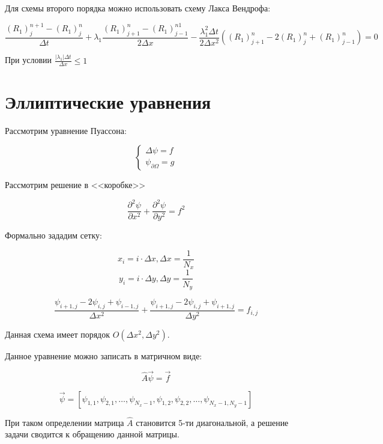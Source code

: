 \documentclass[10pt,a4paper]{article}
\begin{document}
	Для схемы второго порядка можно использовать схему Лакса Вендрофа:
	
	\begin{equation}
		\frac{\left(R_{1}\right)^{n + 1}_{j} - \left(R_{1}\right)^{n}_{j}}
		{\Delta t} + \lambda_{1}
		\frac{\left(R_{1}\right)^{n}_{j + 1} - \left(R_{1}\right)^{n1}_{j - 1}}
		{2\Delta x} - 
		\frac{\lambda_{1}^{2}\Delta t}{2\Delta x^{2}}\left(
		\left(R_{1}\right)^{n}_{j + 1} - 2\left(R_{1}\right)^{n}_{j} + 
		\left(R_{1}\right)^{n}_{j - 1}\right) = 0
	\end{equation}
	
	При условии $\frac{\left|\lambda_{1}\right|\Delta t}{\Delta x} \leqslant 1$
	
	\section{Эллиптические уравнения}
	
	Рассмотрим уравнение Пуассона:
	
	\begin{equation}
		\begin{cases}
			\Delta \psi = f
			\\
			\psi_{\partial \Omega} = g
		\end{cases}
	\end{equation}
	
	Рассмотрим решение в <<коробке>>
	
	\begin{equation}
		\frac{\partial^{2}\psi}{\partial x^{2}} + \frac{\partial^{2}\psi}
		{\partial y^{2}} = f^{2}
	\end{equation}
	
	Формально зададим сетку:
	
	\begin{equation}
		x_{i} = i\cdot\Delta x, \Delta x= \frac{1}{N_{x}}
	\end{equation}
	\begin{equation}
		y_{i} = i\cdot\Delta y, \Delta y= \frac{1}{N_{y}}
	\end{equation}
	
	\begin{equation}
		\frac{\psi_{i + 1, j} - 2\psi_{i, j} + \psi_{i - 1, j}}{\Delta x^{2}} + 
		\frac{\psi_{i + 1, j} - 2\psi_{i, j} + \psi_{i + 1, j}}{\Delta y^{2}} = 
		f_{i, j}
	\end{equation}
	
	Данная схема имеет порядок $O\left(\Delta x^{2}, \Delta y^{2}\right)$.
	
	Данное уравнение можно записать в матричном виде:
	
	\begin{equation}
		\hat{A}\vec{\psi} = \vec{f}
	\end{equation}
	
	\begin{equation}
		\vec{\psi} = \left[\psi_{1, 1}, \psi_{2, 1}, \ldots, \psi_{N_{x} - 1}, 
		\psi_{1, 2}, \psi_{2, 2}, \ldots, \psi_{N_{x} - 1, N_{y} - 1}\right]
	\end{equation}
	
	При таком определении матрица $\hat{A}$ становится 5-ти диагональной, а 
	решение задачи сводится к обращению данной матрицы.
	
\end{document}
